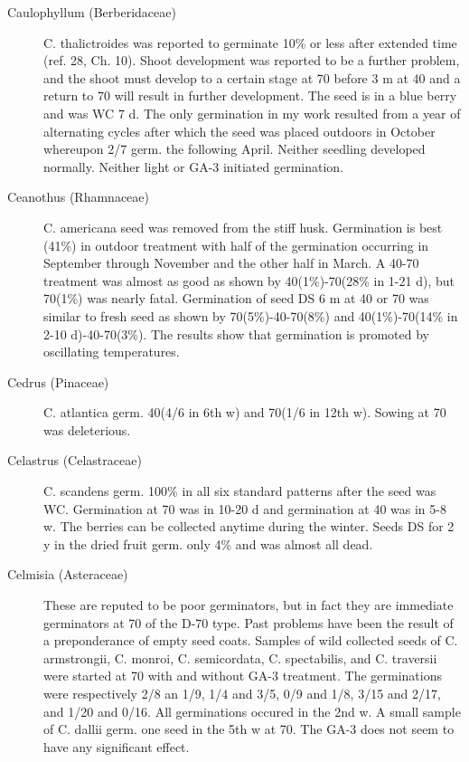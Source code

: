 \begin{description}
\item[Caulophyllum (Berberidaceae)] C. thalictroides was reported to
germinate 10\% or less after extended time (ref. 28, Ch. 10). Shoot development was
reported to be a further problem, and the shoot must develop to a certain stage at 70
before 3 m at 40 and a return to 70 will result in further development. The seed is in a
blue berry and was WC 7 d. The only germination in my work resulted from a year of
alternating cycles after which the seed was placed outdoors in October whereupon 2/7
germ. the following April. Neither seedling developed normally. Neither light or GA-3
initiated germination.
\item[Ceanothus (Rhamnaceae)] C. americana seed was removed from the stiff
husk. Germination is best (41\%) in outdoor treatment with half of the germination
occurring in September through November and the other half in March. A 40-70
treatment was almost as good as shown by 40(1\%)-70(28\% in 1-21 d), but 70(1\%)
was nearly fatal. Germination of seed DS 6 m at 40 or 70 was similar to fresh seed as
shown by 70(5\%)-40-70(8\%) and 40(1\%)-70(14\% in 2-10 d)-40-70(3\%). The results
show that germination is promoted by oscillating temperatures.
\item[Cedrus (Pinaceae)] C. atlantica germ. 40(4/6 in 6th w) and 70(1/6 in 12th
w). Sowing at 70 was deleterious.

\item[Celastrus (Celastraceae)] C. scandens germ. 100\% in all six standard
patterns after the seed was WC. Germination at 70 was in 10-20 d and germination at
40 was in 5-8 w. The berries can be collected anytime during the winter. Seeds DS for
2 y in the dried fruit germ. only 4\% and was almost all dead.

\item[Celmisia (Asteraceae)] These are reputed to be poor germinators, but in
fact they are immediate germinators at 70 of the D-70 type. Past problems have been
the result of a preponderance of empty seed coats. Samples of wild collected seeds of
C. armstrongii, C. monroi, C. semicordata, C. spectabilis, and C. traversii were started
at 70 with and without GA-3 treatment. The germinations were respectively 2/8 an 1/9,
1/4 and 3/5, 0/9 and 1/8, 3/15 and 2/17, and 1/20 and 0/16. All germinations occured
in the 2nd w. A small sample of C. dallii germ. one seed in the 5th w at 70. The GA-3
does not seem to have any significant effect.


\end{description}
